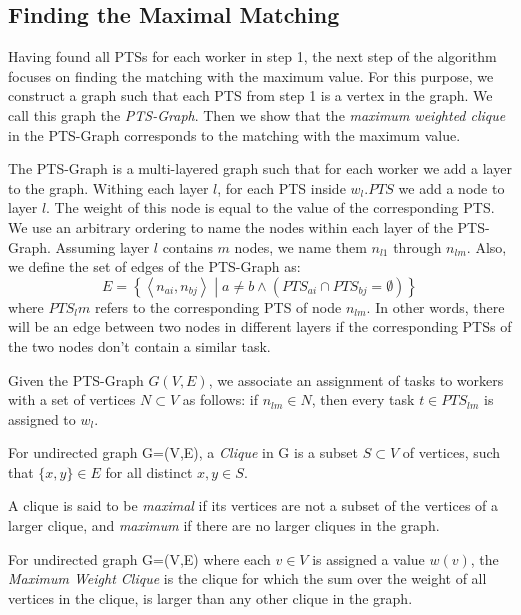 \subsection{Finding the Maximal Matching}
\label{subsec:FindMM}
Having found all PTSs for each worker in step 1, the next step of the algorithm focuses on finding the matching with the maximum value. For this purpose, we construct a graph such that each PTS from step 1 is a vertex in the graph. We call this graph the \emph{PTS-Graph}. Then we show that the \emph{maximum weighted clique} in the PTS-Graph corresponds to the matching with the maximum value.

The PTS-Graph is a multi-layered graph such that for each worker we add a layer to the graph. Withing each layer $l$, for each PTS inside $w_l.PTS$ we add a node to layer $l$. The weight of this node is equal to the value of the corresponding PTS. We use an arbitrary ordering to name the nodes within each layer of the PTS-Graph. Assuming layer $l$ contains $m$ nodes, we name them $n_{l1}$ through $n_{lm}$. Also, we define the set of edges of the PTS-Graph as:
\begin{equation}
E = \left\{ \left\langle n_{ai}, n_{bj} \right\rangle \middle | a \neq b \land \left(PTS_{ai} \cap PTS_{bj} = \emptyset \right) \right\}
\end{equation}
where $PTS_lm$ refers to the corresponding PTS of node $n_{lm}$. In other words, there will be an edge between two nodes in different layers if the corresponding PTSs of the two nodes don't contain a similar task.

Given the PTS-Graph $G(V, E)$, we associate an assignment of tasks to workers with a set of vertices $N \subset V$ as follows: if $n_{lm} \in N$, then every task $t \in PTS_{lm}$ is assigned to $w_l$.

\begin{definition} [Clique]
\label{def:clique}
For undirected graph G=(V,E), a \emph{Clique} in G is a subset $S \subset V$ of vertices, such that $\{x,y\} \in E$ for all distinct $x,y \in S$.
\end{definition}

A clique is said to be \emph{maximal} if its vertices are not a subset of the vertices of a larger clique, and \emph{maximum} if there are no larger cliques in the graph.

\begin{definition} 
\label{def:maxClique}
For undirected graph G=(V,E) where each $v \in V$ is assigned a value $w(v)$, the \emph{Maximum Weight Clique} is the clique for which the sum over the weight of all vertices in the clique, is larger than any other clique in the graph.
\end{definition}

